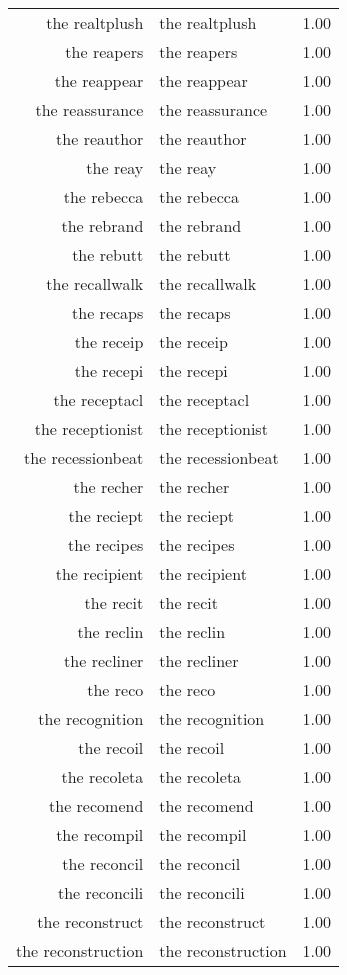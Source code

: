 \begin{table}[ht]
\begin{tabular}{rlr}
  the realtplush & the realtplush & 1.00 \\ 
  the reapers & the reapers & 1.00 \\ 
  the reappear & the reappear & 1.00 \\ 
  the reassurance & the reassurance & 1.00 \\ 
  the reauthor & the reauthor & 1.00 \\ 
  the reay & the reay & 1.00 \\ 
  the rebecca & the rebecca & 1.00 \\ 
  the rebrand & the rebrand & 1.00 \\ 
  the rebutt & the rebutt & 1.00 \\ 
  the recallwalk & the recallwalk & 1.00 \\ 
  the recaps & the recaps & 1.00 \\ 
  the receip & the receip & 1.00 \\ 
  the recepi & the recepi & 1.00 \\ 
  the receptacl & the receptacl & 1.00 \\ 
  the receptionist & the receptionist & 1.00 \\ 
  the recessionbeat & the recessionbeat & 1.00 \\ 
  the recher & the recher & 1.00 \\ 
  the reciept & the reciept & 1.00 \\ 
  the recipes & the recipes & 1.00 \\ 
  the recipient & the recipient & 1.00 \\ 
  the recit & the recit & 1.00 \\ 
  the reclin & the reclin & 1.00 \\ 
  the recliner & the recliner & 1.00 \\ 
  the reco & the reco & 1.00 \\ 
  the recognition & the recognition & 1.00 \\ 
  the recoil & the recoil & 1.00 \\ 
  the recoleta & the recoleta & 1.00 \\ 
  the recomend & the recomend & 1.00 \\ 
  the recompil & the recompil & 1.00 \\ 
  the reconcil & the reconcil & 1.00 \\ 
  the reconcili & the reconcili & 1.00 \\ 
  the reconstruct & the reconstruct & 1.00 \\ 
  the reconstruction & the reconstruction & 1.00 \\ 

\end{tabular}
\end{table}
